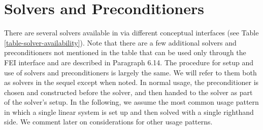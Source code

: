 
\chapter{Solvers and Preconditioners}
\label{ch-Solvers}

There are several solvers available in \hypre{} via different
conceptual interfaces (see Table \ref{table-solver-availability}).
Note that there are a few additional solvers and preconditioners not
mentioned in the table that can be used only through the FEI interface
and are described in Paragraph 6.14.
The procedure for setup and use of solvers and preconditioners is
largely the same. We will refer to them both as solvers in the sequel
except when noted.  In normal usage, the preconditioner is chosen and
constructed before the solver, and then handed to the solver as part
of the solver's setup.  In the following, we assume the most common
usage pattern in which a single linear system is set up and then
solved with a single righthand side. We comment later on
considerations for other usage patterns.

